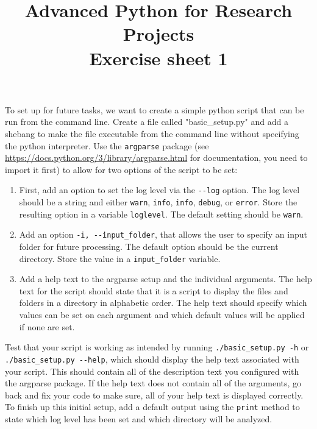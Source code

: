 \documentclass[]{erlangen-problemset}
\title{{\Large Advanced Python for Research Projects} \\[0.3cm] 
Exercise sheet 1}
\begin{document}


\begin{problem}[title={Creating a standalone python script}]
\noindent
To set up for future tasks, we want to create a simple python script that can be run from the command line. 
\Question Create a file called "basic\_setup.py" and add a shebang to make the file executable from the command line without specifying the python interpreter.
\Question Use the \texttt{argparse} package (see \url{https://docs.python.org/3/library/argparse.html} for documentation, you need to import it first) to allow for two options of the script to be set:
\begin{enumerate}
	\item First, add an option to set the log level via the \texttt{-\.-log} option. 
	The log level should be a string and either \texttt{warn}, \texttt{info}, \texttt{info}, \texttt{debug}, or \texttt{error}. 
	Store the resulting option in a variable \texttt{loglevel}. 
	The default setting should be \texttt{warn}.
	\item Add an option \texttt{-i, -\.-input\_folder}, that allows the user to specify an input folder for future processing. 
	The default option should be the current directory. 
	Store the value in a \texttt{input\_folder} variable.
	\item Add a help text to the argparse setup and the individual arguments. 
	The help text for the script should state that it is a script to display the files and folders in a directory in alphabetic order. 
	The help text should specify which values can be set on each argument and which default values will be applied if none are set.
\end{enumerate}
\Question Test that your script is working as intended by running \texttt{./basic\_setup.py -h} or {\texttt{./basic\_setup.py -\.-help}}, which should display the help text associated with your script. 
This should contain all of the description text you configured with the argparse package.
If the help text does not contain all of the arguments, go back and fix your code to make sure, all of your help text is displayed correctly.
\Question To finish up this initial setup, add a default output using the \texttt{print} method to state which log level has been set and which directory will be analyzed.
\end{problem}
\end{document}
